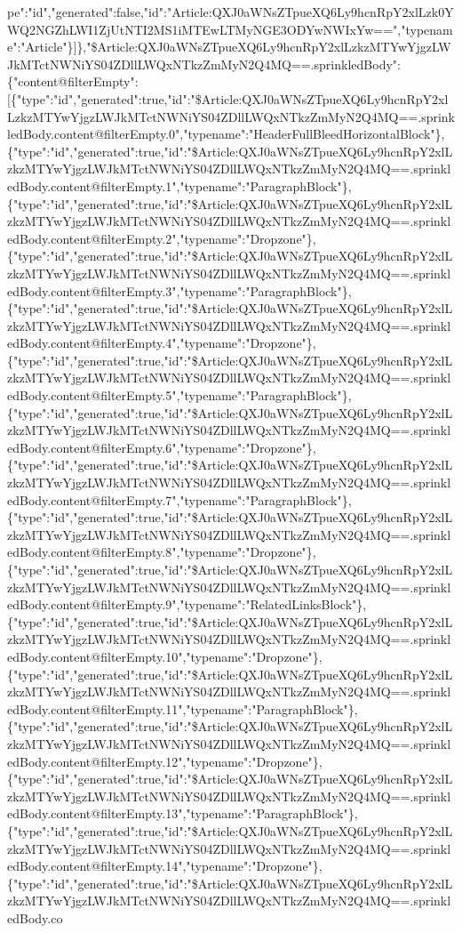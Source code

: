pe":"id","generated":false,"id":"Article:QXJ0aWNsZTpueXQ6Ly9hcnRpY2xlLzk0YWQ2NGZhLWI1ZjUtNTI2MS1iMTEwLTMyNGE3ODYwNWIxYw==","typename":"Article"\}{]}\},"\$Article:QXJ0aWNsZTpueXQ6Ly9hcnRpY2xlLzkzMTYwYjgzLWJkMTctNWNiYS04ZDllLWQxNTkzZmMyN2Q4MQ==.sprinkledBody":\{"content@filterEmpty":{[}\{"type":"id","generated":true,"id":"\$Article:QXJ0aWNsZTpueXQ6Ly9hcnRpY2xlLzkzMTYwYjgzLWJkMTctNWNiYS04ZDllLWQxNTkzZmMyN2Q4MQ==.sprinkledBody.content@filterEmpty.0","typename":"HeaderFullBleedHorizontalBlock"\},\{"type":"id","generated":true,"id":"\$Article:QXJ0aWNsZTpueXQ6Ly9hcnRpY2xlLzkzMTYwYjgzLWJkMTctNWNiYS04ZDllLWQxNTkzZmMyN2Q4MQ==.sprinkledBody.content@filterEmpty.1","typename":"ParagraphBlock"\},\{"type":"id","generated":true,"id":"\$Article:QXJ0aWNsZTpueXQ6Ly9hcnRpY2xlLzkzMTYwYjgzLWJkMTctNWNiYS04ZDllLWQxNTkzZmMyN2Q4MQ==.sprinkledBody.content@filterEmpty.2","typename":"Dropzone"\},\{"type":"id","generated":true,"id":"\$Article:QXJ0aWNsZTpueXQ6Ly9hcnRpY2xlLzkzMTYwYjgzLWJkMTctNWNiYS04ZDllLWQxNTkzZmMyN2Q4MQ==.sprinkledBody.content@filterEmpty.3","typename":"ParagraphBlock"\},\{"type":"id","generated":true,"id":"\$Article:QXJ0aWNsZTpueXQ6Ly9hcnRpY2xlLzkzMTYwYjgzLWJkMTctNWNiYS04ZDllLWQxNTkzZmMyN2Q4MQ==.sprinkledBody.content@filterEmpty.4","typename":"Dropzone"\},\{"type":"id","generated":true,"id":"\$Article:QXJ0aWNsZTpueXQ6Ly9hcnRpY2xlLzkzMTYwYjgzLWJkMTctNWNiYS04ZDllLWQxNTkzZmMyN2Q4MQ==.sprinkledBody.content@filterEmpty.5","typename":"ParagraphBlock"\},\{"type":"id","generated":true,"id":"\$Article:QXJ0aWNsZTpueXQ6Ly9hcnRpY2xlLzkzMTYwYjgzLWJkMTctNWNiYS04ZDllLWQxNTkzZmMyN2Q4MQ==.sprinkledBody.content@filterEmpty.6","typename":"Dropzone"\},\{"type":"id","generated":true,"id":"\$Article:QXJ0aWNsZTpueXQ6Ly9hcnRpY2xlLzkzMTYwYjgzLWJkMTctNWNiYS04ZDllLWQxNTkzZmMyN2Q4MQ==.sprinkledBody.content@filterEmpty.7","typename":"ParagraphBlock"\},\{"type":"id","generated":true,"id":"\$Article:QXJ0aWNsZTpueXQ6Ly9hcnRpY2xlLzkzMTYwYjgzLWJkMTctNWNiYS04ZDllLWQxNTkzZmMyN2Q4MQ==.sprinkledBody.content@filterEmpty.8","typename":"Dropzone"\},\{"type":"id","generated":true,"id":"\$Article:QXJ0aWNsZTpueXQ6Ly9hcnRpY2xlLzkzMTYwYjgzLWJkMTctNWNiYS04ZDllLWQxNTkzZmMyN2Q4MQ==.sprinkledBody.content@filterEmpty.9","typename":"RelatedLinksBlock"\},\{"type":"id","generated":true,"id":"\$Article:QXJ0aWNsZTpueXQ6Ly9hcnRpY2xlLzkzMTYwYjgzLWJkMTctNWNiYS04ZDllLWQxNTkzZmMyN2Q4MQ==.sprinkledBody.content@filterEmpty.10","typename":"Dropzone"\},\{"type":"id","generated":true,"id":"\$Article:QXJ0aWNsZTpueXQ6Ly9hcnRpY2xlLzkzMTYwYjgzLWJkMTctNWNiYS04ZDllLWQxNTkzZmMyN2Q4MQ==.sprinkledBody.content@filterEmpty.11","typename":"ParagraphBlock"\},\{"type":"id","generated":true,"id":"\$Article:QXJ0aWNsZTpueXQ6Ly9hcnRpY2xlLzkzMTYwYjgzLWJkMTctNWNiYS04ZDllLWQxNTkzZmMyN2Q4MQ==.sprinkledBody.content@filterEmpty.12","typename":"Dropzone"\},\{"type":"id","generated":true,"id":"\$Article:QXJ0aWNsZTpueXQ6Ly9hcnRpY2xlLzkzMTYwYjgzLWJkMTctNWNiYS04ZDllLWQxNTkzZmMyN2Q4MQ==.sprinkledBody.content@filterEmpty.13","typename":"ParagraphBlock"\},\{"type":"id","generated":true,"id":"\$Article:QXJ0aWNsZTpueXQ6Ly9hcnRpY2xlLzkzMTYwYjgzLWJkMTctNWNiYS04ZDllLWQxNTkzZmMyN2Q4MQ==.sprinkledBody.content@filterEmpty.14","typename":"Dropzone"\},\{"type":"id","generated":true,"id":"\$Article:QXJ0aWNsZTpueXQ6Ly9hcnRpY2xlLzkzMTYwYjgzLWJkMTctNWNiYS04ZDllLWQxNTkzZmMyN2Q4MQ==.sprinkledBody.co
